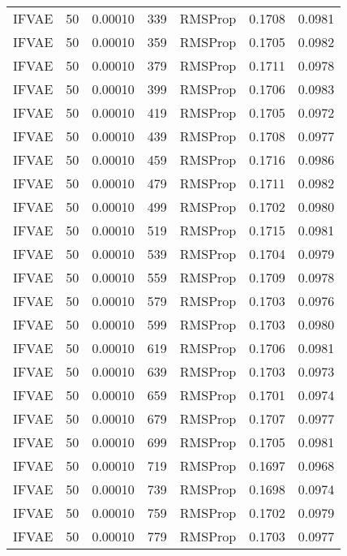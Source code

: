 \begin{tabular}{llrllrr}
   IFVAE &   50 &  0.00010 &   339 &   RMSProp &  0.1708 &       0.0981 \\
   IFVAE &   50 &  0.00010 &   359 &   RMSProp &  0.1705 &       0.0982 \\
   IFVAE &   50 &  0.00010 &   379 &   RMSProp &  0.1711 &       0.0978 \\
   IFVAE &   50 &  0.00010 &   399 &   RMSProp &  0.1706 &       0.0983 \\
   IFVAE &   50 &  0.00010 &   419 &   RMSProp &  0.1705 &       0.0972 \\
   IFVAE &   50 &  0.00010 &   439 &   RMSProp &  0.1708 &       0.0977 \\
   IFVAE &   50 &  0.00010 &   459 &   RMSProp &  0.1716 &       0.0986 \\
   IFVAE &   50 &  0.00010 &   479 &   RMSProp &  0.1711 &       0.0982 \\
   IFVAE &   50 &  0.00010 &   499 &   RMSProp &  0.1702 &       0.0980 \\
   IFVAE &   50 &  0.00010 &   519 &   RMSProp &  0.1715 &       0.0981 \\
   IFVAE &   50 &  0.00010 &   539 &   RMSProp &  0.1704 &       0.0979 \\
   IFVAE &   50 &  0.00010 &   559 &   RMSProp &  0.1709 &       0.0978 \\
   IFVAE &   50 &  0.00010 &   579 &   RMSProp &  0.1703 &       0.0976 \\
   IFVAE &   50 &  0.00010 &   599 &   RMSProp &  0.1703 &       0.0980 \\
   IFVAE &   50 &  0.00010 &   619 &   RMSProp &  0.1706 &       0.0981 \\
   IFVAE &   50 &  0.00010 &   639 &   RMSProp &  0.1703 &       0.0973 \\
   IFVAE &   50 &  0.00010 &   659 &   RMSProp &  0.1701 &       0.0974 \\
   IFVAE &   50 &  0.00010 &   679 &   RMSProp &  0.1707 &       0.0977 \\
   IFVAE &   50 &  0.00010 &   699 &   RMSProp &  0.1705 &       0.0981 \\
   IFVAE &   50 &  0.00010 &   719 &   RMSProp &  0.1697 &       0.0968 \\
   IFVAE &   50 &  0.00010 &   739 &   RMSProp &  0.1698 &       0.0974 \\
   IFVAE &   50 &  0.00010 &   759 &   RMSProp &  0.1702 &       0.0979 \\
   IFVAE &   50 &  0.00010 &   779 &   RMSProp &  0.1703 &       0.0977 \\

\end{tabular}
